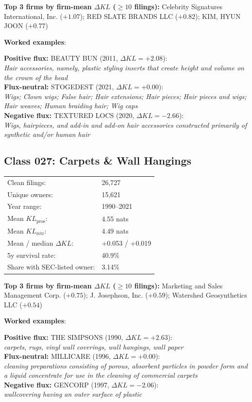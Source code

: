 \textbf{Top 3 firms by firm-mean $\Delta KL$ ($\geq 10$ filings):} Celebrity Signatures International, Inc. ($+1.07$); RED SLATE BRANDS LLC ($+0.82$); KIM, HYUN JOON ($+0.77$)

\textbf{Worked examples}:

  \textbf{Positive flux:} \textsc{BEAUTY BUN} (2011, $\Delta KL=+2.08$):\\
  \textit{Hair accessories, namely, plastic styling inserts that create height and volume on the crown of the head}\\
  \textbf{Flux-neutral:} \textsc{STOGEDEST} (2021, $\Delta KL=+0.00$):\\
  \textit{Wigs; Clown wigs; False hair; Hair extensions; Hair pieces; Hair pieces and wigs; Hair weaves; Human braiding hair; Wig caps}\\
  \textbf{Negative flux:} \textsc{TEXTURED LOCS} (2020, $\Delta KL=-2.66$):\\
  \textit{Wigs, hairpieces, and add-in and add-on hair accessories constructed primarily of synthetic and/or human hair}\\

\subsection*{Class 027: Carpets \& Wall Hangings}
\label{app:industry-027}

\begin{tabular}{ll}
Clean filings: & 26,727 \\
Unique owners: & 15,621 \\
Year range: & 1990--2021 \\
Mean $KL_\text{pros}$: & 4.55 nats \\
Mean $KL_\text{retr}$: & 4.49 nats \\
Mean / median $\Delta KL$: & +0.053 / +0.019 \\
5y survival rate: & 40.9\% \\
Share with SEC-listed owner: & 3.14\% \\
\end{tabular}

\textbf{Top 3 firms by firm-mean $\Delta KL$ ($\geq 10$ filings):} Marketing and Sales Management Corp. ($+0.75$); J. Josephson, Inc. ($+0.59$); Watershed Geosynthetics LLC ($+0.54$)

\textbf{Worked examples}:

  \textbf{Positive flux:} \textsc{THE SIMPSONS} (1990, $\Delta KL=+2.63$):\\
  \textit{carpets, rugs, vinyl wall coverings, wall hangings, wall paper}\\
  \textbf{Flux-neutral:} \textsc{MILLICARE} (1996, $\Delta KL=+0.00$):\\
  \textit{cleaning preparations consisting of porous, absorbent particles in powder form and a liquid concentrate for use in the cleaning of commercial carpets}\\
  \textbf{Negative flux:} \textsc{GENCORP} (1997, $\Delta KL=-2.06$):\\
  \textit{wallcovering having an outer surface of plastic}\\

